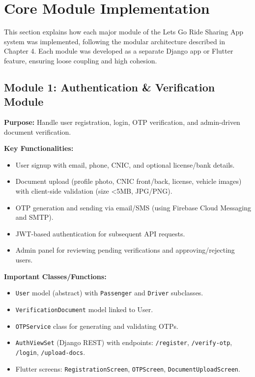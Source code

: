 \section{Core Module Implementation}

This section explains how each major module of the Lets Go Ride Sharing App system was implemented, following the modular architecture described in Chapter 4. Each module was developed as a separate Django app or Flutter feature, ensuring loose coupling and high cohesion.

\subsection{Module 1: Authentication \& Verification Module}

\textbf{Purpose:} Handle user registration, login, OTP verification, and admin-driven document verification.

\textbf{Key Functionalities:}
\begin{itemize}
    \item User signup with email, phone, CNIC, and optional license/bank details.
    \item Document upload (profile photo, CNIC front/back, license, vehicle images) with client-side validation (size <5MB, JPG/PNG).
    \item OTP generation and sending via email/SMS (using Firebase Cloud Messaging and SMTP).
    \item JWT-based authentication for subsequent API requests.
    \item Admin panel for reviewing pending verifications and approving/rejecting users.
\end{itemize}

\textbf{Important Classes/Functions:}
\begin{itemize}
    \item \texttt{User} model (abstract) with \texttt{Passenger} and \texttt{Driver} subclasses.
    \item \texttt{VerificationDocument} model linked to User.
    \item \texttt{OTPService} class for generating and validating OTPs.
    \item \texttt{AuthViewSet} (Django REST) with endpoints: \texttt{/register}, \texttt{/verify-otp}, \texttt{/login}, \texttt{/upload-docs}.
    \item Flutter screens: \texttt{RegistrationScreen}, \texttt{OTPScreen}, \texttt{DocumentUploadScreen}.
\end{itemize}

